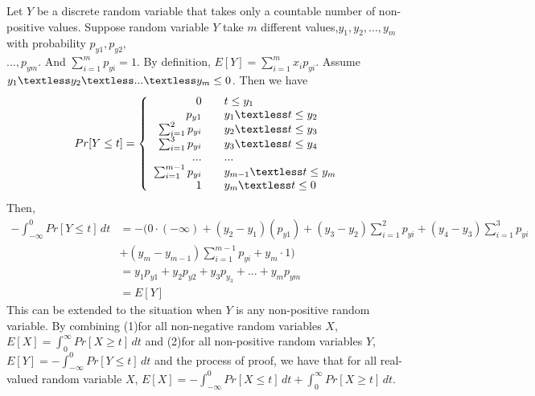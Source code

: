 Let $Y$ be a discrete random variable that takes only a countable number of non-positive values. Suppose random variable $Y$ take $m$ different values,$y_1, y_2,...,y_m$ with probability $p_{y1},p_{y2},$\\$...,p_{ym}$. And $\sum_{i=1}^{m}p_{yi}=1$.
By definition, $E[Y]=\sum_{i=1}^{m}x_ip_{yi}$.
Assume $y_1\textless y_2\textless ...\textless y_m\le0$.
Then we have
\begin{equation}
\nonumber Pr[Y\le t]=\left\{
\begin{array}{rcl}
0 & & {t \le y_1}\\
p_{y1} & & {y_1 \textless t \le y_2}\\
\sum_{i=1}^{2}p_{yi} & & {y_2 \textless t \le y_3}\\
\sum_{i=1}^{3}p_{yi} & & {y_3 \textless t \le y_4}\\
... & & ...\\
\sum_{i=1}^{m-1}p_{yi} & & {y_{m-1} \textless t \le y_m}\\
1 & & {y_m \textless t\le 0}
\end{array} \right.
\end{equation}
Then,
\begin{align}
  \nonumber -\int_{-\infty}^{0}Pr[Y\le t]\, dt &=-(0\cdot (-\infty)+(y_2-y_1)(p_{y1})+(y_3-y_2)\sum_{i=1}^{2}p_{yi}+(y_4-y_3)\sum_{i=1}^{3}p_{yi}\\
  \nonumber &+(y_m-y_{m-1})\sum_{i=1}^{m-1}p_{yi}+y_m \cdot 1)\\
  \nonumber &=y_1p_{y1}+y_2p_{y2}+y_3p_{y_3}+...+y_mp_{ym}\\
  \nonumber &=E[Y]
\end{align}
This can be extended to the situation when $Y$ is any non-positive random variable.
By combining (1)for all non-negative random variables $X$, $E[X]=\int_{0}^{\infty}Pr[X\ge t]\, dt$ and (2)for all non-positive random variables $Y$, $E[Y]=-\int_{-\infty}^{0}Pr[Y\le t]\, dt$ and the process of proof, we have that for all real-valued random variable $X$, $E[X]=-\int_{-\infty}^{0}Pr[X\le t]\, dt+\int_{0}^{\infty}Pr[X\ge t]\, dt$.


